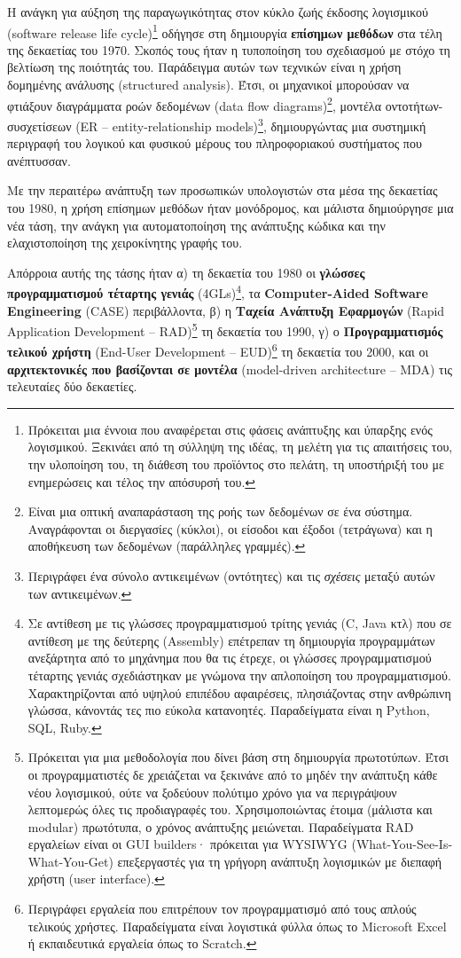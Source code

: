         Η ανάγκη για αύξηση της παραγωγικότητας στον κύκλο ζωής έκδοσης λογισμικού (software release life cycle)\footnote{Πρόκειται μια έννοια που αναφέρεται στις φάσεις ανάπτυξης και ύπαρξης ενός λογισμικού. Ξεκινάει από τη σύλληψη της ιδέας, τη μελέτη για τις απαιτήσεις του, την υλοποίηση του, τη διάθεση του προϊόντος στο πελάτη, τη υποστήριξή του με ενημερώσεις και τέλος την απόσυρσή του.} οδήγησε στη δημιουργία \textbf{επίσημων μεθόδων} στα τέλη της δεκαετίας του 1970. Σκοπός τους ήταν η τυποποίηση του σχεδιασμού με στόχο τη βελτίωση της ποιότητάς του. Παράδειγμα αυτών των τεχνικών είναι η χρήση δομημένης ανάλυσης (structured analysis). Έτσι, οι μηχανικοί μπορούσαν να φτιάξουν διαγράμματα ροών δεδομένων (data flow diagrams)\footnote{Είναι μια οπτική αναπαράσταση της ροής των δεδομένων σε ένα σύστημα. Αναγράφονται οι διεργασίες (κύκλοι), οι είσοδοι και έξοδοι (τετράγωνα) και η αποθήκευση των δεδομένων (παράλληλες γραμμές).}, μοντέλα οντοτήτων-συσχετίσεων (ER -- entity-relationship models)\footnote{Περιγράφει ένα σύνολο αντικειμένων (οντότητες) και τις \textit{σχέσεις} μεταξύ αυτών των αντικειμένων.}, δημιουργώντας μια συστημική περιγραφή του λογικού και φυσικού μέρους του πληροφοριακού συστήματος που ανέπτυσσαν.

        Με την περαιτέρω ανάπτυξη των προσωπικών υπολογιστών στα μέσα της δεκαετίας του 1980, η χρήση επίσημων μεθόδων ήταν μονόδρομος, και μάλιστα δημιούργησε μια νέα τάση, την ανάγκη για αυτοματοποίηση της ανάπτυξης κώδικα και την ελαχιστοποίηση της χειροκίνητης γραφής του.

        Απόρροια αυτής της τάσης ήταν α) τη δεκαετία του 1980 οι \textbf{γλώσσες προγραμματισμού τέταρτης γενιάς} (4GLs)\footnote{Σε αντίθεση με τις γλώσσες προγραμματισμού τρίτης γενιάς (C, Java κτλ) που σε αντίθεση με της δεύτερης (Assembly) επέτρεπαν τη δημιουργία προγραμμάτων ανεξάρτητα από το μηχάνημα που θα τις έτρεχε, οι γλώσσες προγραμματισμού τέταρτης γενιάς σχεδιάστηκαν με γνώμονα την απλοποίηση του προγραμματισμού. Χαρακτηρίζονται από υψηλού επιπέδου αφαιρέσεις, πλησιάζοντας στην ανθρώπινη γλώσσα, κάνοντάς τες πιο εύκολα κατανοητές. Παραδείγματα είναι η Python, SQL, Ruby.}, τα \textbf{Computer-Aided Software Engineering} (CASE) περιβάλλοντα, β) η \textbf{Ταχεία Ανάπτυξη Εφαρμογών} (Rapid Application Development -- RAD)\footnote{Πρόκειται για μια μεθοδολογία που δίνει βάση στη δημιουργία πρωτοτύπων. Έτσι οι προγραμματιστές δε χρειάζεται να ξεκινάνε από το μηδέν την ανάπτυξη κάθε νέου λογισμικού, ούτε να ξοδεύουν πολύτιμο χρόνο για να περιγράψουν λεπτομερώς όλες τις προδιαγραφές του. Χρησιμοποιώντας έτοιμα (μάλιστα και modular) πρωτότυπα, ο χρόνος ανάπτυξης μειώνεται. Παραδείγματα RAD εργαλείων είναι οι GUI builders· πρόκειται για WYSIWYG (What-You-See-Is-What-You-Get) επεξεργαστές για τη γρήγορη ανάπτυξη λογισμικών με διεπαφή χρήστη (user interface).} τη δεκαετία του 1990, γ) ο \textbf{Προγραμματισμός τελικού χρήστη} (End-User Development -- EUD)\footnote{Περιγράφει εργαλεία που επιτρέπουν τον προγραμματισμό από τους απλούς τελικούς χρήστες. Παραδείγματα είναι λογιστικά φύλλα όπως το Microsoft Excel ή εκπαιδευτικά εργαλεία όπως το Scratch.} τη δεκαετία του 2000, και οι \textbf{αρχιτεκτονικές που βασίζονται σε μοντέλα} (model-driven architecture -- MDA) τις τελευταίες δύο δεκαετίες. \cite{Case1985, CASEChikofsky, MDELow}


